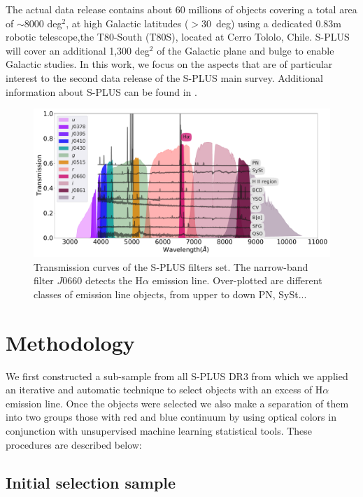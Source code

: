 \documentclass[fleqn,usenatbib]{mnras}
\begin{document}
The actual data release contains about 60 millions of objects covering a total
area of $\sim$8000 deg$^2$, at high Galactic latitudes ($ > 30$~deg) using a
dedicated 0.83m robotic telescope,the T80-South (T80S), located at Cerro Tololo,
Chile. S-PLUS will cover an additional 1,300 deg$^2$ of the Galactic plane and bulge
to enable Galactic studies. In this work, we focus on the aspects that are of
particular interest to the second data release of the S-PLUS main survey.
Additional information about S-PLUS can be found in \citet{Mendes:2019}. 

\begin{figure}
    \includegraphics[width=0.9\linewidth]{Figs/splus-filter.pdf}
    \caption{Transmission curves of the S-PLUS filters set. The narrow-band filter
      $J0660$ detects the H$\alpha$ emission line. Over-plotted are different
      classes of emission line objects, from upper to down PN, SySt... }
    \label{fig:curves}
\end{figure}

\section{Methodology}
\label{sec:metho}

We first constructed a sub-sample from all S-PLUS DR3 from which we
applied an iterative and automatic technique to select objects with
an excess of H{$\alpha$} emission line. Once the objects were selected
we also make a separation of them into two groups those with red and blue
continuum by using optical colors in conjunction with unsupervised
 machine learning statistical tools. These procedures are described below:

\subsection{Initial selection sample}
\label{sec:}
\end{document}
